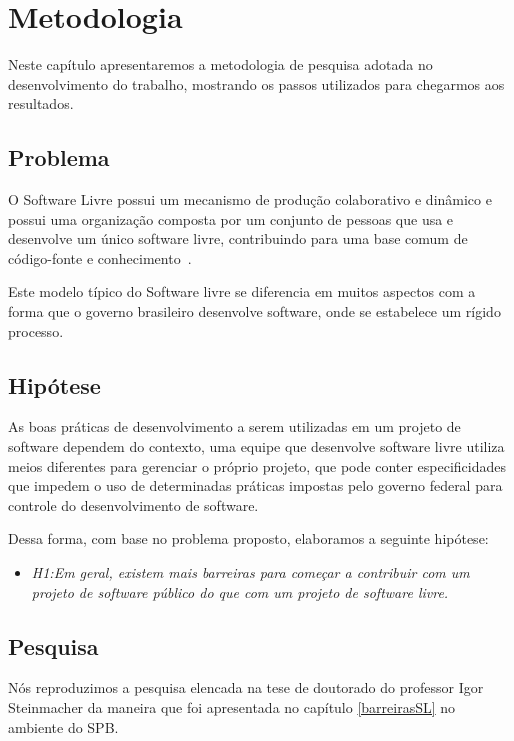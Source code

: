 \chapter{Metodologia}
\label{sec:metodologia}

Neste capítulo apresentaremos a metodologia de pesquisa adotada no desenvolvimento 
do trabalho, mostrando os passos utilizados para chegarmos aos resultados.


\section{Problema}

O Software Livre possui um mecanismo de produção colaborativo e dinâmico 
e possui uma organização composta por um conjunto de pessoas que usa e desenvolve 
um único software livre, contribuindo para uma base comum de código-fonte e 
conhecimento~\cite{reis2003caracterizacc}.

Este modelo típico do Software livre se diferencia em muitos aspectos com a forma
que o governo brasileiro desenvolve software, onde se estabelece um rígido processo.


\section{Hipótese}

As boas práticas de desenvolvimento a serem utilizadas em um projeto de software 
dependem do contexto, uma equipe que desenvolve software livre utiliza
meios diferentes para gerenciar o próprio projeto, que pode conter especificidades 
que impedem o uso de determinadas práticas impostas pelo governo federal para controle
do desenvolvimento de software. 

Dessa forma, com base no problema proposto, elaboramos a seguinte hipótese:

\begin{itemize}
\item \emph{H1:Em geral, existem mais barreiras para começar a contribuir 
com um projeto de software público do que com um projeto de software livre.}

\end{itemize}

\section{Pesquisa}

Nós reproduzimos a pesquisa elencada na tese de doutorado do professor Igor 
Steinmacher da maneira que foi apresentada no capítulo \ref{barreirasSL} no ambiente
do SPB.

